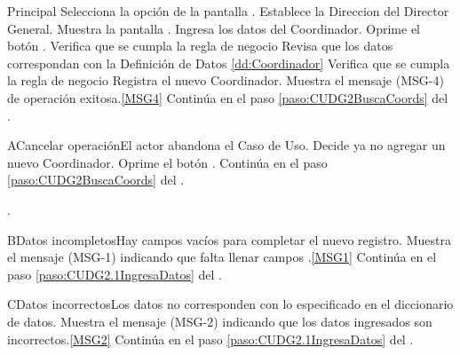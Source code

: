	\begin{UCtrayectoria}{Principal}
			\UCpaso[\UCactor] Selecciona la opción  de la pantalla .
			\UCpaso Establece la Direccion del Director General.
			\UCpaso Muestra la pantalla .
			\UCpaso [\UCactor] Ingresa los datos del Coordinador. \label{paso:CUDG2.1IngresaDatos}
			\UCpaso [\UCactor] Oprime el botón .
			\UCpaso Verifica que se cumpla la regla de negocio  
			\UCpaso Revisa que los datos correspondan con la Definición de Datos \ref{dd:Coordinador} 
			\UCpaso Verifica que se cumpla la regla de negocio  
			\UCpaso Registra el nuevo Coordinador.
			\UCpaso Muestra el mensaje (MSG-4) de operación exitosa.\ref{MSG4}
			\UCpaso Continúa en el paso \ref{paso:CUDG2BuscaCoords} del .
	\end{UCtrayectoria}

	\begin{UCtrayectoriaA}{A}{Cancelar operación}{El actor abandona el Caso de Uso.}
			\UCpaso[\UCactor] Decide ya no agregar un nuevo Coordinador.
			\UCpaso[\UCactor] Oprime el botón .
			\UCpaso Continúa en el paso \ref{paso:CUDG2BuscaCoords} del .
	\end{UCtrayectoriaA}
		.
	\begin{UCtrayectoriaA}{B}{Datos incompletos}{Hay campos vacíos para completar el nuevo registro.}
			\UCpaso Muestra el mensaje (MSG-1) indicando que falta llenar campos .\ref{MSG1} 
			\UCpaso Continúa en el paso \ref{paso:CUDG2.1IngresaDatos} del .
	\end{UCtrayectoriaA}

	\begin{UCtrayectoriaA}{C}{Datos incorrectos}{Los datos no corresponden con lo especificado en el diccionario de datos.}
			\UCpaso Muestra el mensaje (MSG-2) indicando que los datos ingresados son incorrectos.\ref{MSG2}
			\UCpaso Continúa en el paso \ref{paso:CUDG2.1IngresaDatos} del .
	\end{UCtrayectoriaA}

